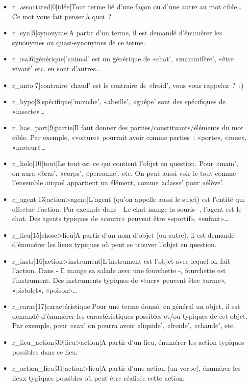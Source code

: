 \documentclass[a4paper,11pt,french]{article}
\begin{document}
\begin{itemize}
\item r\_associated|0|idée|Tout terme lié d'une façon ou d'une autre au mot cible\dots{} Ce mot vous fait penser à quoi~? 
\item r\_syn|5|synonyme|A partir d'un terme, il est demandé d'énumérer les synonymes ou quasi-synonymes de ce terme. \item r\_isa|6|générique|'animal' est un générique de «chat', «mammifère', «être vivant' etc. en sont d'autres\dots{}
\item r\_anto|7|contraire|'chaud' est le contraire de «froid', vous vous rappelez~?~:)
\item r\_hypo|8|spécifique|'mouche', «abeille', «guêpe' sont des spécifiques de «insecte»\dots{}
\item r\_has\_part|9|partie|Il faut donner des parties/constituants/éléments du mot cible. Par exemple, «voiture» pourrait avoir comme parties~: «porte», «roue», «moteur»\dots{}
\item r\_holo|10|tout|Le tout est ce qui contient l'objet en question. Pour «main', on aura «bras', «corps', «personne', etc. On peut aussi voir le tout comme l'ensemble auquel appartient un élément, comme «classe' pour «élève'.
\item r\_agent|13|action>agent|L'agent (qu'on appelle aussi le sujet) est l'entité qui effectue l'action. Par exemple dans - Le chat mange la souris -, l'agent est le chat. Des agents typiques de «courir» peuvent être «sportif», «enfant»\dots{} 
\item r\_lieu|15|chose>lieu|A partir d'un nom d'objet (ou autre), il est demandé d'énumérer les lieux typiques où peut se trouver l'objet en question.
\item r\_instr|16|action>instrument|L'instrument est l'objet avec lequel on fait l'action. Dans - Il mange sa salade avec une fourchette -, fourchette est l'instrument. Des instruments typiques de «tuer» peuvent être «arme», «pistolet», «poison»\dots{}
\item r\_carac|17|caractéristique|Pour une terme donné, en général un objet, il est demandé d'énumérer les caractéristiques possibles et/ou typiques de cet objet. Par exemple, pour «eau' on pourra avoir «liquide', «froide', «chaude', etc.
\item r\_lieu\_action|30|lieu>action|A partir d'un lieu, énumérer les action typiques possibles dans ce lieu.
\item r\_action\_lieu|31|action>lieu|A partir d'une action (un verbe), énumérer les lieux typiques possibles où peut être réalisée cette action.
\end{itemize}
\end{document}
